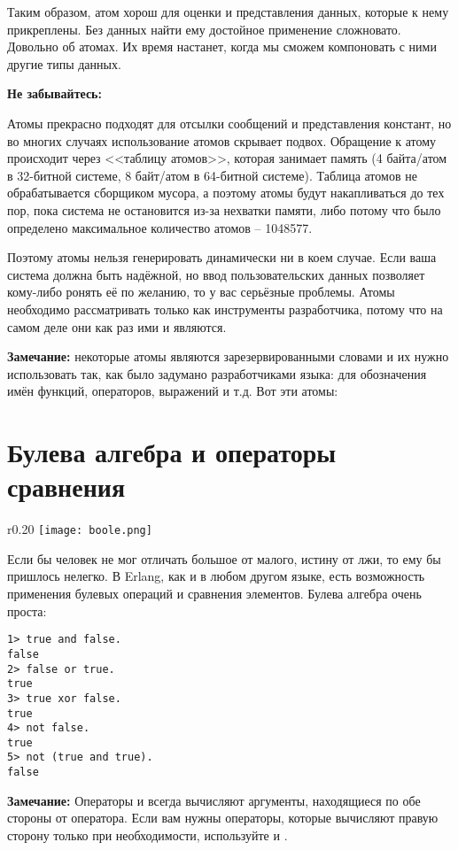 Таким образом, атом хорош для оценки и представления данных, которые к нему прикреплены.
Без данных найти ему достойное применение сложновато.
Довольно об атомах.
Их время настанет, когда мы сможем компоновать с ними другие типы данных.
\\ 
\colorbox{lorange}
{
    \begin{minipage}{1.0\linewidth}
\textbf{Не забывайтесь:}

Атомы прекрасно подходят для отсылки сообщений и представления констант, но во многих случаях использование атомов скрывает подвох.
Обращение к атому происходит через <<таблицу атомов>>, которая занимает память (4 байта/атом в 32\--битной системе, 8 байт/атом в 64\--битной системе).
Таблица атомов не обрабатывается сборщиком мусора, а поэтому атомы будут накапливаться до тех пор, пока система не остановится из\--за нехватки памяти, либо потому что было определено максимальное количество атомов \--- 1048577.

Поэтому атомы нельзя генерировать динамически ни в коем случае.
Если ваша система должна быть надёжной, но ввод пользовательских данных позволяет кому\--либо ронять её по желанию, то у вас серьёзные проблемы.
Атомы необходимо рассматривать только как инструменты разработчика, потому что на самом деле они как раз ими и являются.
\end{minipage}
}
\colorbox{lgray}{
    \begin{minipage}{1.0\linewidth}
    \textbf{Замечание:} некоторые атомы являются зарезервированными словами и их нужно использовать так, как было задумано разработчиками языка: для обозначения имён функций, операторов, выражений и т.д.
    Вот эти атомы: 
\end{minipage}
}
\section{Булева алгебра и операторы сравнения}
\label{boolean-algebra-comparison-operators}
\begin{wrapfigure}[7]{r}{0.20\linewidth}
    \texttt{[image: boole.png]}
\end{wrapfigure}
Если бы человек не мог отличать большое от малого, истину от лжи, то ему бы пришлось нелегко.
В Erlang, как и в любом другом языке, есть возможность применения булевых операций и сравнения элементов.
Булева алгебра очень проста:\\ 
\begin{lstlisting}[style=repl]
1> true and false.
false
2> false or true.
true
3> true xor false.
true
4> not false.
true
5> not (true and true).
false
\end{lstlisting} 
\colorbox{lgray}
{
    \begin{minipage}{1.0\linewidth}
        \textbf{Замечание:} Операторы  и  всегда вычисляют аргументы, находящиеся по обе стороны от оператора.
        Если вам нужны операторы, которые вычисляют правую сторону только при необходимости, используйте  и .
    \end{minipage}
} 

